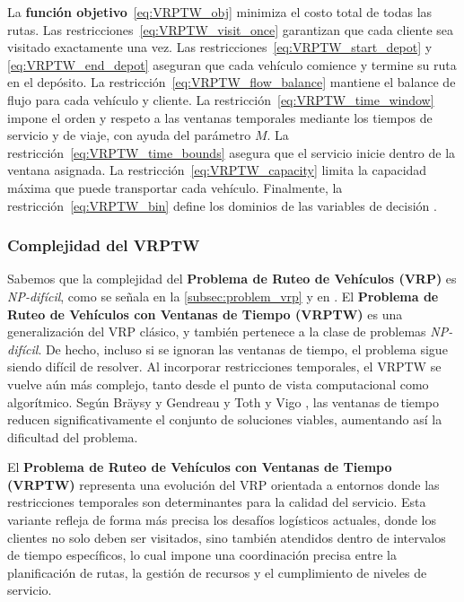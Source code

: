 \documentclass[12pt,titlepage,twoside,openright]{book}
\begin{document}
La \textbf{función objetivo}~\eqref{eq:VRPTW_obj} minimiza el costo total de todas las rutas. Las restricciones~\eqref{eq:VRPTW_visit_once} garantizan que cada cliente sea visitado exactamente una vez. Las restricciones~\eqref{eq:VRPTW_start_depot} y \eqref{eq:VRPTW_end_depot} aseguran que cada vehículo comience y termine su ruta en el depósito. La restricción~\eqref{eq:VRPTW_flow_balance} mantiene el balance de flujo para cada vehículo y cliente. La restricción~\eqref{eq:VRPTW_time_window} impone el orden y respeto a las ventanas temporales mediante los tiempos de servicio y de viaje, con ayuda del parámetro \(M\). La restricción~\eqref{eq:VRPTW_time_bounds} asegura que el servicio inicie dentro de la ventana asignada. La restricción~\eqref{eq:VRPTW_capacity} limita la capacidad máxima que puede transportar cada vehículo. Finalmente, la restricción~\eqref{eq:VRPTW_bin} define los dominios de las variables de decisión \citep{toth2014}.

\subsubsection*{Complejidad del VRPTW}

Sabemos que la complejidad del \textbf{Problema de Ruteo de Vehículos (VRP)} es \textit{NP-difícil}, como se señala en la \autoref{subsec:problem_vrp} y en \citep{laporte1987}. El \textbf{Problema de Ruteo de Vehículos con Ventanas de Tiempo (VRPTW)} es una generalización del VRP clásico, y también pertenece a la clase de problemas \textit{NP-difícil}. De hecho, incluso si se ignoran las ventanas de tiempo, el problema sigue siendo difícil de resolver. Al incorporar restricciones temporales, el VRPTW se vuelve aún más complejo, tanto desde el punto de vista computacional como algorítmico. Según Bräysy y Gendreau \citep{braysy2005} y Toth y Vigo \citep{toth2014}, las ventanas de tiempo reducen significativamente el conjunto de soluciones viables, aumentando así la dificultad del problema.


El \textbf{Problema de Ruteo de Vehículos con Ventanas de Tiempo (VRPTW)} representa una evolución del VRP orientada a entornos donde las restricciones temporales son determinantes para la calidad del servicio. Esta variante refleja de forma más precisa los desafíos logísticos actuales, donde los clientes no solo deben ser visitados, sino también atendidos dentro de intervalos de tiempo específicos, lo cual impone una coordinación precisa entre la planificación de rutas, la gestión de recursos y el cumplimiento de niveles de servicio.
\end{document}
